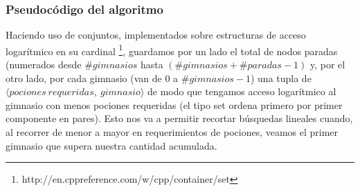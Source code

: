     \subsubsection{Pseudocódigo del algoritmo}

    Haciendo uso de conjuntos, implementados sobre estructuras de acceso logarítmico en su cardinal \footnote{http://en.cppreference.com/w/cpp/container/set}, guardamos por un lado el total de nodos paradas (numerados desde $\#gimnasios$ hasta $(\#gimnasios + \#paradas - 1)$ y, por el otro lado, por cada gimnasio (van de 0 a $\#gimnasios-1$) una tupla de $\langle pociones\ requeridas,\ gimnasio \rangle$ de modo que tengamos acceso logarítmico al gimnasio con menos pociones requeridas (el tipo set ordena primero por primer componente en pares). Esto nos va a permitir recortar búsquedas lineales cuando, al recorrer de menor a mayor en requerimientos de pociones, veamos el primer gimnasio que supera nuestra cantidad acumulada.
    \\

